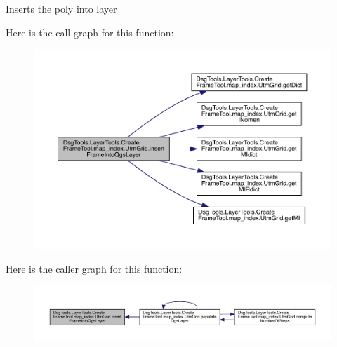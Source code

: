 \begin{DoxyVerb}Inserts the poly into layer
\end{DoxyVerb}
 Here is the call graph for this function\+:
\nopagebreak
\begin{figure}[H]
\begin{center}
\leavevmode
\includegraphics[width=350pt]{class_dsg_tools_1_1_layer_tools_1_1_create_frame_tool_1_1map__index_1_1_utm_grid_a7384e3bce25108782525f098a7fe8df9_cgraph}
\end{center}
\end{figure}
Here is the caller graph for this function\+:
\nopagebreak
\begin{figure}[H]
\begin{center}
\leavevmode
\includegraphics[width=350pt]{class_dsg_tools_1_1_layer_tools_1_1_create_frame_tool_1_1map__index_1_1_utm_grid_a7384e3bce25108782525f098a7fe8df9_icgraph}
\end{center}
\end{figure}
\mbox{\label{class_dsg_tools_1_1_layer_tools_1_1_create_frame_tool_1_1map__index_1_1_utm_grid_ad3d5253b7101efeb9013a23103041c7f}} 
